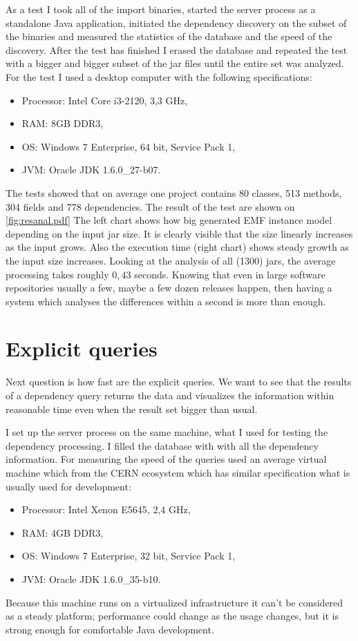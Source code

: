 As a test I took all of the import binaries, started the server process as a
standalone Java application, initiated the dependency discovery on the subset of
the binaries and measured the statistics of the database and the speed of the
discovery. After the test has finished I erased the database and repeated the
test with a bigger and bigger subset of the jar files until the entire set was
analyzed. For the test I used a desktop computer with the following
specifications:
\begin{itemize}
  \item Processor: Intel Core i3-2120, 3,3 GHz,
  \item RAM: 8GB DDR3,
  \item OS: Windows 7 Enterprise, 64 bit, Service Pack 1,
  \item JVM: Oracle JDK 1.6.0\_27-b07.
\end{itemize}
The tests showed that on average one project contains 80 classes, 513 methods, 304 fields and 778 dependencies. 
The result of the test are shown on \autoref{fig:resanal.pdf}
The left chart shows how big generated EMF instance model depending on the
input jar size. It is clearly visible that the size linearly increases
as the input grows. Also the execution time (right chart) shows 
steady growth as the input size increases. Looking at the analysis
 of all (1300) jars, the average processing takes roughly $0,43$ seconds.
Knowing that even in large software repositories usually a few, maybe a few 
dozen releases happen, then having a system which analyses the differences within
a second is more than enough.

\section{Explicit queries}
\label{sect:explqueries}
Next question is how fast are the explicit queries. We want to see that the
results of a dependency query returns the data and visualizes the information
within reasonable time even when the result set bigger than usual. 

I set up the server process on the same machine, what I used for 
testing the dependency processing. I filled the database with with all the
dependency information. For measuring the speed of the queries used an average
virtual machine which from the CERN ecosystem which has similar specification
what is usually used for development:
\begin{itemize}
  \item Processor: Intel Xenon E5645, 2,4 GHz,
  \item RAM: 4GB DDR3,
  \item OS: Windows 7 Enterprise, 32 bit, Service Pack 1,
  \item JVM: Oracle JDK 1.6.0\_35-b10.
\end{itemize}
Because this machine runs on a virtualized infrastructure it can't be
considered as a steady platform; performance could change as the usage changes,
but it is strong enough for comfortable Java development. 

